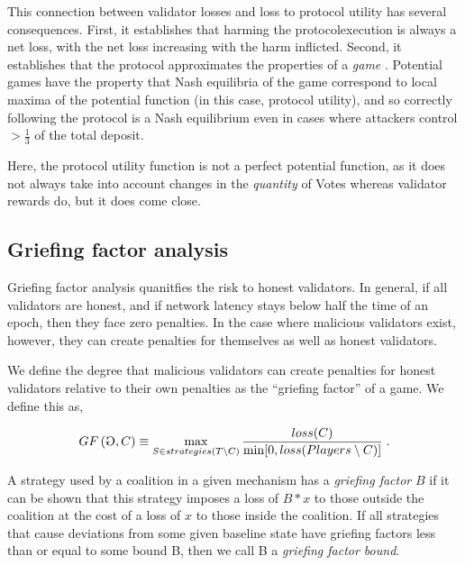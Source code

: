 \documentclass[12pt, final]{article}
\newcommand{\gamesymbol}{\reflectbox{G}}
\newcommand{\GF}[1]{GF\left( #1 \right)\space}
\begin{document}
This connection between validator losses and loss to protocol utility has several consequences. First, it establishes that harming the protocolexecution is always a net loss, with the net loss increasing with the harm inflicted. Second, it establishes that the protocol approximates the properties of a \emph{game} \cite{monderer1996potential}. Potential games have the property that Nash equilibria of the game correspond to local maxima of the potential function (in this case, protocol utility), and so correctly following the protocol is a Nash equilibrium even in cases where attackers control $>\frac{1}{3}$ of the total deposit.

Here, the protocol utility function is not a perfect potential function, as it does not always take into account changes in the \emph{quantity} of Votes whereas validator rewards do, but it does come close. 

\subsection{Griefing factor analysis}
\label{sect:griefingfactor}
Griefing factor analysis quanitfies the risk to honest validators. In general, if all validators are honest, and if network latency stays below half  the time of an epoch, then they face zero penalties.  In the case where malicious validators exist, however, they can create penalties for themselves as well as honest validators.

We define the degree that malicious validators can create penalties for honest validators relative to their own penalties as the ``griefing factor'' of a game.  We define this as,

\begin{equation}
\GF{ \gamesymbol,C } \equiv \max_{S \in strategies(T \setminus C)} \frac{loss(C) }{\min[ 0, loss(Players \setminus C) ] } \; .
\end{equation}





\begin{definition}
A strategy used by a coalition in a given mechanism has a \emph{griefing factor} $B$ if it can be shown that this strategy imposes a loss of $B * x$ to those outside the coalition at the cost of a loss of $x$ to those inside the coalition. If all strategies that cause deviations from some given baseline state have griefing factors less than or equal to some bound B, then we call B a \emph{griefing factor bound}. 
\end{definition}
\end{document}

